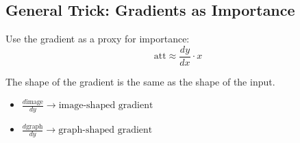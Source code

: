 \subsection{General Trick: Gradients as Importance}
\begin{definition}
    Use the gradient as a proxy for importance:
    \begin{equation*}
        \text{att} \approx \frac{dy}{dx} \cdot x
    \end{equation*}
\end{definition}

\begin{warning}
    The shape of the gradient is the same as the shape of the input.
    \begin{itemize}
        \item $\frac{d\text{image}}{dy} \rightarrow \text{image-shaped gradient}$
    \end{itemize}
    \begin{itemize}
        \item $\frac{d\text{graph}}{dy} \rightarrow \text{graph-shaped gradient}$
    \end{itemize}
\end{warning}

